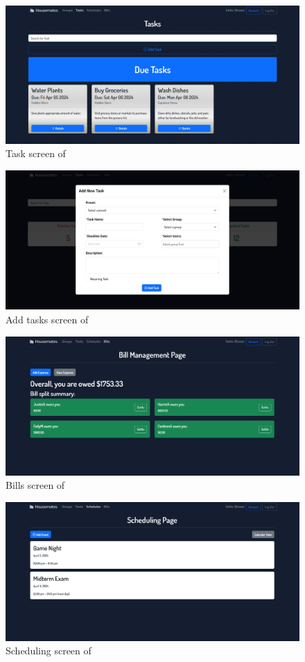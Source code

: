 \documentclass[12pt, titlepage]{article}
\begin{document}
\begin{figure}[H]
\centering
\includegraphics[width=\textwidth]{Task.png}
\caption{Task screen of \progname{}}
\label{FigAccount}
\end{figure}

\begin{figure}[H]
\centering
\includegraphics[width=\textwidth]{AddTask.png}
\caption{Add tasks screen of \progname{}}
\label{FigTasks}
\end{figure}

\begin{figure}[H]
\centering
\includegraphics[width=\textwidth]{Bills.png}
\caption{Bills screen of \progname{}}
\label{FigBills}
\end{figure}

\begin{figure}[H]
\centering
\includegraphics[width=\textwidth]{Events.png}
\caption{Scheduling screen of \progname{}}
\label{FigEvents}
\end{figure}

\end{document}
